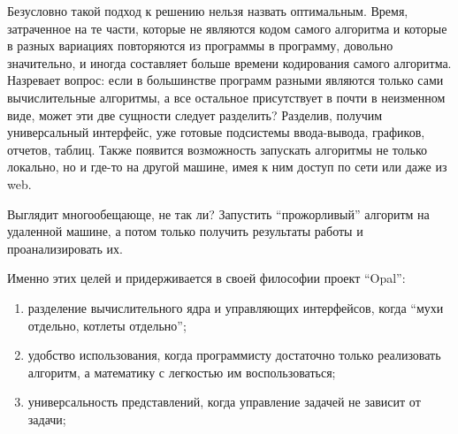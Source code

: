 Безусловно такой подход к решению нельзя назвать оптимальным. Время, затраченное на те части, которые не являются кодом самого алгоритма и которые в разных вариациях повторяются из программы в программу, довольно значительно, и иногда составляет больше времени кодирования самого алгоритма.
Назревает вопрос: если в большинстве программ разными являются только сами вычислительные алгоритмы, а все остальное присутствует в почти в неизменном виде, может эти две сущности следует разделить? Разделив, получим универсальный интерфейс, уже готовые подсистемы ввода-вывода, графиков, отчетов, таблиц. Также появится возможность запускать алгоритмы не только локально, но и где-то на другой машине, имея к ним доступ по сети или даже из web.

Выглядит многообещающе, не так ли? Запустить “прожорливый” алгоритм на удаленной машине, а потом только получить результаты работы и проанализировать их.

Именно этих целей и придерживается в своей философии проект “Opal”:
\begin{enumerate}
\item разделение вычислительного ядра и управляющих интерфейсов, когда “мухи отдельно, котлеты отдельно”;
\item удобство использования, когда программисту достаточно только реализовать алгоритм, а математику с легкостью им воспользоваться;
\item универсальность представлений, когда управление задачей не зависит от задачи;
\end{enumerate}